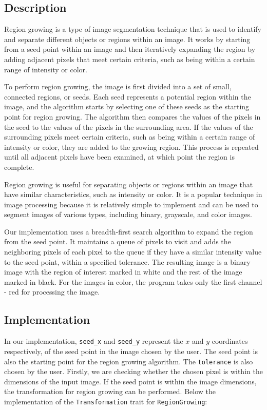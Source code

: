 \documentclass[12pt]{article}
\begin{document}
\subsection{Description}
Region growing is a type of image segmentation technique that is used to identify and separate different objects or regions within an image. It works by starting from a seed point within an image and then iteratively expanding the region by adding adjacent pixels that meet certain criteria, such as being within a certain range of intensity or color.

To perform region growing, the image is first divided into a set of small, connected regions, or seeds. Each seed represents a potential region within the image, and the algorithm starts by selecting one of these seeds as the starting point for region growing. The algorithm then compares the values of the pixels in the seed to the values of the pixels in the surrounding area. If the values of the surrounding pixels meet certain criteria, such as being within a certain range of intensity or color, they are added to the growing region. This process is repeated until all adjacent pixels have been examined, at which point the region is complete.

Region growing is useful for separating objects or regions within an image that have similar characteristics, such as intensity or color. It is a popular technique in image processing because it is relatively simple to implement and can be used to segment images of various types, including binary, grayscale, and color images.

Our implementation uses a breadth-first search algorithm to expand the region from the seed point. It maintains a queue of pixels to visit and adds the neighboring pixels of each pixel to the queue if they have a similar intensity value to the seed point, within a specified tolerance. The resulting image is a binary image with the region of interest marked in white and the rest of the image marked in black. For the images in color, the program takes only the first channel - red for processing the image.

\subsection{Implementation}

In our implementation, \lstinline{seed_x} and \lstinline{seed_y} represent the $x$ and $y$ coordinates respectively,
of the seed point in the image chosen by the user.
The seed point is also the starting point for the region growing algorithm.
The \lstinline{tolerance} is also chosen by the user.
Firstly, we are checking whether the chosen pixel is within the dimensions of the input image.
If the seed point is within the image dimensions,
the transformation for region growing can be performed.
Below the implementation of the \lstinline{Transformation} trait for \lstinline{RegionGrowing}:
\end{document}
